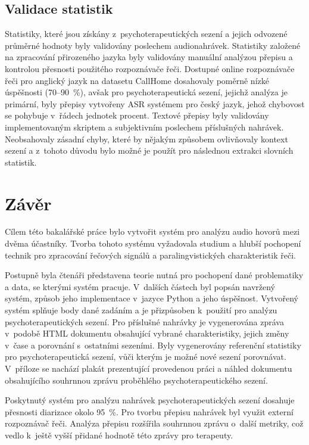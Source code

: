 \section{Validace statistik}
\label{section:Stats_testing}
Statistiky, které jsou získány z~psychoterapeutických sezení a jejich odvozené průměrné hodnoty byly validovány poslechem audionahrávek. Statistiky založené na zpracování přirozeného jazyka byly validovány manuální analýzou přepisu a kontrolou přesnosti použitého rozpoznávače řeči. Dostupné online rozpoznávače řeči pro anglický jazyk na datasetu CallHome dosahovaly poměrně nízké úspěšnosti (70--90~\%), avšak pro psychoterapeutická sezení, jejichž analýza je primární, byly přepisy vytvořeny ASR systémem pro český jazyk, jehož chybovost se pohybuje v~řádech jednotek procent. Textové přepisy byly validovány implementovaným skriptem a subjektivním poslechem příslušných nahrávek. Neobsahovaly zásadní chyby, které by nějakým způsobem ovlivňovaly kontext sezení a z~tohoto důvodu bylo možné je použít pro následnou extrakci slovních statistik.



\chapter{Závěr}
\label{chap:Conclusion}
Cílem této bakalářské práce bylo vytvořit systém pro analýzu audio hovorů mezi dvěma účastníky. Tvorba tohoto systému vyžadovala studium a hlubší pochopení technik pro zpracování řečových signálů a paralingvistických charakteristik řeči. 

Postupně byla čtenáři představena teorie nutná pro pochopení dané problematiky a data, se kterými systém pracuje. V~dalších částech byl popsán navržený systém, způsob jeho implementace v~jazyce Python a jeho úspěšnost. Vytvořený systém splňuje body dané zadáním a je přizpůsoben k~použití pro analýzu psychoterapeutických sezení. Pro příslušné nahrávky je vygenerována zpráva v~podobě HTML dokumentu obsahující vybrané charakteristiky, jejich změny v~čase a porovnání s~ostatními sezeními. Byly vygenerovány referenční statistiky pro psychoterapeutická sezení, vůči kterým je možné nové sezení porovnávat. V~příloze se nachází plakát prezentující provedenou práci a náhled dokumentu obsahujícího souhrnnou zprávu proběhlého psychoterapeutického sezení.

Poskytnutý systém pro analýzu nahrávek psychoterapeutických sezení dosahuje přesnosti diarizace okolo 95~\%. Pro tvorbu přepisu nahrávek byl využit externí rozpoznávač řeči. Analýza přepisu rozšířila souhrnnou zprávu o~další metriky, což vedlo k~ještě vyšší přidané hodnotě této zprávy pro terapeuty. 

